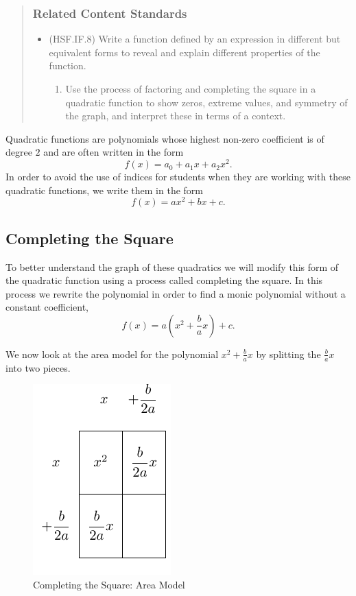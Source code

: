 \documentclass[
]{book}
\providecommand{\tightlist}{%
  \setlength{\itemsep}{0pt}\setlength{\parskip}{0pt}}
\theoremstyle{definition}
\theoremstyle{definition}
\theoremstyle{definition}
\theoremstyle{remark}
\begin{document}
\begin{quote}
\hypertarget{related-content-standards-47}{%
\subsubsection*{Related Content Standards}\label{related-content-standards-47}}

\begin{itemize}
\tightlist
\item
  (HSF.IF.8) Write a function defined by an expression in different but equivalent forms to reveal and explain different properties of the function.

  \begin{enumerate}
  \def\labelenumi{\alph{enumi}.}
  \tightlist
  \item
    Use the process of factoring and completing the square in a quadratic function to show zeros, extreme values, and symmetry of the graph, and interpret these in terms of a context.
  \end{enumerate}
\end{itemize}
\end{quote}

Quadratic functions are polynomials whose highest non-zero coefficient is of degree \(2\) and are often written in the form \[f(x)=a_0 + a_1 x + a_2 x^2.\] In order to avoid the use of indices for students when they are working with these quadratic functions, we write them in the form
\[f(x)=ax^2 + bx +c.\]

\hypertarget{completing-the-square}{%
\subsection{Completing the Square}\label{completing-the-square}}

To better understand the graph of these quadratics we will modify this form of the quadratic function using a process called completing the square. In this process we rewrite the polynomial in order to find a monic polynomial without a constant coefficient,
\[f(x) = a \left( x^2 +\frac{b}{a}x \right) + c.\]

We now look at the area model for the polynomial \(x^2+\frac{b}{a}x\) by splitting the \(\frac{b}{a}x\) into two pieces.

\begin{figure}

{\centering \includegraphics[width=0.2\linewidth]{tikz/completing-square} 

}

\caption{Completing the Square: Area Model}\label{fig:unnamed-chunk-217}
\end{figure}
\end{document}
